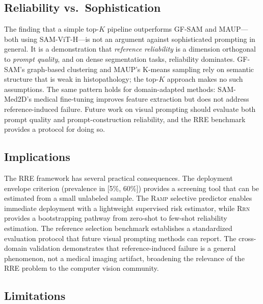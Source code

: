\documentclass[10pt,twocolumn,letterpaper]{article}
\newcommand{\RAMP}{\textsc{Ramp}}
\newcommand{\RRN}{\textsc{Rrn}}
\begin{document}
\subsection{Reliability vs.\ Sophistication}

The finding that a simple top-$K$ pipeline outperforms GF-SAM and MAUP---both
using SAM-ViT-H---is not an argument against sophisticated prompting in
general. It is a demonstration that \emph{reference reliability} is a
dimension orthogonal to \emph{prompt quality}, and on dense segmentation
tasks, reliability dominates. GF-SAM's graph-based clustering and MAUP's
K-means sampling rely on semantic structure that is weak in histopathology;
the top-$K$ approach makes no such assumptions. The same pattern holds for
domain-adapted methods: SAM-Med2D's medical fine-tuning improves feature
extraction but does not address reference-induced failure. Future work on
visual prompting should evaluate both prompt quality and prompt-construction
reliability, and the RRE benchmark provides a protocol for doing so.

\subsection{Implications}

The RRE framework has several practical consequences. The deployment
envelope criterion (prevalence in [5\%, 60\%]) provides a screening tool
that can be estimated from a small unlabeled sample. The
\RAMP{} selective predictor enables immediate deployment with a lightweight
supervised risk estimator, while \RRN{}
provides a bootstrapping pathway from zero-shot to few-shot reliability
estimation. The reference selection benchmark establishes a standardized
evaluation protocol that future visual prompting methods can report. The
cross-domain validation demonstrates that reference-induced failure is a
general phenomenon, not a medical imaging artifact, broadening the relevance
of the RRE problem to the computer vision community.

\subsection{Limitations}
\end{document}
